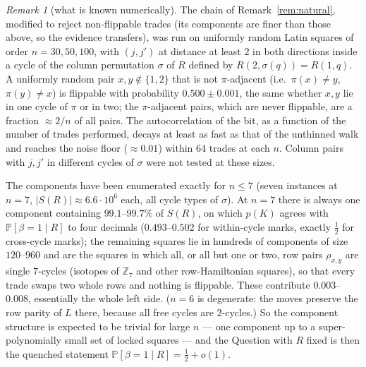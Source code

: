 \documentclass[11pt]{amsart}
\theoremstyle{remark}
\newtheorem{remark}{Remark}
\renewcommand{\Pr}{\mathbb{P}}
\begin{document}
\begin{remark}[what is known numerically]\label{rem:numerics}
The chain of Remark~\ref{rem:natural}, modified to reject
non-flippable trades (its components are finer than those above, so
the evidence transfers), was run on uniformly random Latin squares of
order $n=30,50,100$, with $(j,j')$ at distance at least $2$ in both
directions inside a cycle of the column permutation $\sigma$ of $R$
defined by $R(2,\sigma(q))=R(1,q)$.  A uniformly random pair
$x,y\notin\{1,2\}$ that is not $\pi$-adjacent (i.e.\ $\pi(x)\ne y$,
$\pi(y)\ne x$) is flippable with probability $0.500\pm0.001$, the
same whether $x,y$ lie in one cycle of $\pi$ or in two; the
$\pi$-adjacent pairs, which are never flippable, are a fraction
$\approx2/n$ of all pairs.  The autocorrelation of the bit, as a
function of the number of trades performed, decays at least as fast
as that of the unthinned walk and reaches the noise floor
($\approx0.01$) within $64$ trades at each $n$.  Column pairs with
$j,j'$ in different cycles of $\sigma$ were not tested at these
sizes.

The components have been enumerated exactly for $n\le7$ (seven
instances at $n=7$, $|S(R)|\approx6.6\cdot10^6$ each, all cycle types
of $\sigma$).  At $n=7$ there is always one component containing
$99.1$--$99.7\%$ of $S(R)$, on which $p(K)$ agrees with
$\Pr[\beta=1\mid R]$ to four decimals ($0.493$--$0.502$ for
within-cycle marks, exactly $\tfrac12$ for cross-cycle marks); the
remaining squares lie in hundreds of components of size $120$--$960$
and are the squares in which all, or all but one or two, row pairs
$\rho_{x,y}$ are single $7$-cycles (isotopes of $\mathbb Z_7$ and other
row-Hamiltonian squares), so that every trade swaps two whole rows and
nothing is flippable.  These contribute $0.003$--$0.008$, essentially
the whole left side.  ($n=6$ is degenerate: the moves preserve the row
parity of $L$ there, because all free cycles are $2$-cycles.)  So the
component structure is expected to be trivial for large $n$ --- one
component up to a super-polynomially small set of locked squares ---
and the Question with $R$ fixed is then the quenched statement
$\Pr[\beta=1\mid R]=\tfrac12+o(1)$.
\end{remark}
\end{document}
